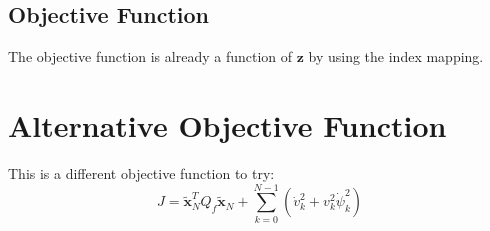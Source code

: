 \documentclass[12pt, letterpaper]{report}
\newcommand{\vect}[1]{\boldsymbol{\mathbf{#1}}}
\begin{document}
\subsection*{Objective Function}
The objective function is already a function of $\vect{z}$ by using the
index mapping.

\section*{Alternative Objective Function}
This is a different objective function to try:
\begin{equation}
  J = \tilde{\vect{x}}_N^T Q_f \tilde{\vect{x}}_N +
  \sum_{k=0}^{N-1}(\dot{v}_k^2 + v_k^2\dot{\psi}_k^2)
\end{equation}


\end{document}
